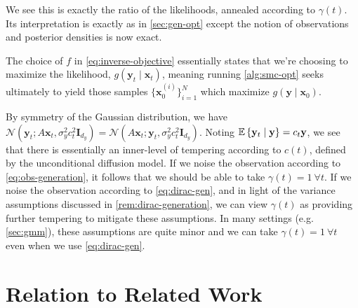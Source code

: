 We see this is exactly the ratio of the likelihoods, annealed according to $\gamma(t)$. Its
interpretation is exactly as in \ref{sec:gen-opt} except the notion of observations and posterior
densities is now exact.

\begin{remark}
    The choice of $f$ in \ref{eq:inverse-objective} essentially states that
    we're choosing to maximize the likelihood, $g(\mathbf{y}_t \mid \mathbf{x}_t)$, meaning running
    \ref{alg:smc-opt} seeks ultimately to yield those samples $\{\mathbf{x}_0^{(i)}\}_{i=1}^N$ which
    maximize $g(\mathbf{y} \mid \mathbf{x}_0)$.
\end{remark}

\begin{remark}
    By symmetry of the Gaussian distribution, we have
    $\mathcal{N}(\mathbf{y}_t; A\mathbf{x}_t, \sigma_y^2c_t^2\mathbf{I}_{d_y})=\mathcal{N}(A\mathbf{x}_t; \mathbf{y}_t, \sigma_y^2c_t^2\mathbf{I}_{d_y})$.
    Noting $\mathbb{E} \left\{ \mathbf{y}_t \mid \mathbf{y} \right\} = c_t \mathbf{y}$, we see that there is essentially an
    inner-level of tempering according to $c(t)$, defined by the unconditional diffusion model.
    If we noise the observation according to \ref{eq:obs-generation}, it follows that we should be
    able to take $\gamma(t) = 1\ \forall t$. If we noise the observation according to
    \ref{eq:dirac-gen}, and in light of the variance assumptions discussed in
    \ref{rem:dirac-generation}, we can view $\gamma(t)$ as providing further tempering to mitigate
    these assumptions. In many settings (e.g. \ref{sec:gmm}), these assumptions are quite minor
    and we can take $\gamma(t) = 1\ \forall t$ even when we use \ref{eq:dirac-gen}.
\end{remark}

\section{Relation to Related Work} \label{sec:relation-to-related}

